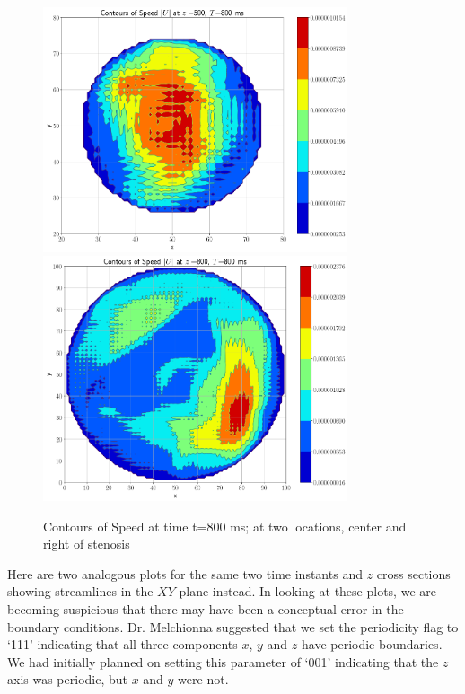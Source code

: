 \documentclass[11pt]{article} %
\begin{document}
\begin{figure}[h!]
\centering
\hspace*{-0.25in}
\includegraphics[width=0.8\textwidth]{contour_speed/contour_speed_z_500_t_800.png}
\includegraphics[width=0.8\textwidth]{contour_speed/contour_speed_z_800_t_800.png}
\caption{Contours of Speed at time t=800 ms; at two locations, center and right of stenosis}
\end{figure}

Here are two analogous plots for the same two time instants and $z$ cross sections showing
streamlines in the $XY$ plane instead.
In looking at these plots, we are becoming suspicious that there may have been a 
conceptual error in the boundary conditions.  
Dr. Melchionna suggested that we set the periodicity flag to `111' indicating that all three
components $x$, $y$ and $z$ have periodic boundaries.
We had initially planned on setting this parameter of `001' indicating that the $z$ axis
was periodic, but $x$ and $y$ were not.
\end{document}
